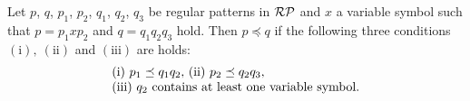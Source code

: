 \begin{thm}\label{Sato1:Lemma9}
    Let $p$, $q$, $p_{1}$, $p_{2}$, $q_{1}$, $q_{2}$, $q_{3}$ be regular patterns in $\mathcal{RP}$ and $x$ a variable symbol such that 
    $p = p_{1}xp_{2}$ and $q = q_{1}q_{2}q_{3}$ hold.
    Then $p \preceq q$ if the following three conditions $(\mathrm{i}),~(\mathrm{ii})$ and $(\mathrm{iii})$ are holds:
    \[
        \begin{tabular}{ll}
            $(\mathrm{i})$ $p_{1} \preceq q_{1}q_{2},$
            $(\mathrm{ii})$ $p_{2} \preceq q_{2}q_{3},$ \\
            $(\mathrm{iii})$ $q_{2}$ contains at least one variable symbol.
        \end{tabular}
    \]
\end{thm}


